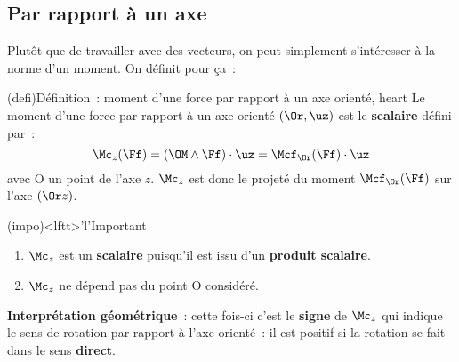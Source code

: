 \documentclass[../../main/main.tex]{subfiles}
\begin{document}
\subsection{Par rapport à un axe }
Plutôt que de travailler avec des vecteurs, on peut simplement s'intéresser à la
norme d'un moment. On définit pour ça~:
\begin{tcb*}(defi){Définition~: moment d'une force par rapport à un axe orienté,
			heart}
	Le moment d'une force par rapport à un axe orienté $(\Or,\uz)$ est le
	\textbf{scalaire} défini par~:
	\[\Mc_z(\Ff) = \left(\OM\wedge\Ff\right)\cdot\uz = \Mcf_{\Or}(\Ff)\cdot\uz\]
	avec O un point de l'axe $z$. $\Mc_z$ est donc le projeté du moment
	$\Mcf_{\Or}(\Ff)$ sur l'axe $(\Or z)$.
\end{tcb*}
\begin{tcb*}(impo)<lftt>'l'{Important}
	\begin{enumerate}
		\item $\Mc_z$ est un \textbf{scalaire} puisqu'il est issu d'un
		      \textbf{produit scalaire}.
		\item $\Mc_z$ ne dépend pas du point O considéré.
	\end{enumerate}
\end{tcb*}
\textbf{Interprétation géométrique}~: cette fois-ci c'est le \textbf{signe} de
$\Mc_z$ qui indique le sens de rotation par rapport à l'axe orienté~: il est
positif si la rotation se fait dans le sens \textbf{direct}.
\end{document}

